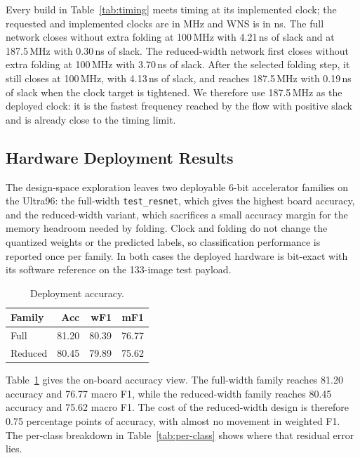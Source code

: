 Every build in Table~\ref{tab:timing} meets timing at its implemented clock; the
requested and implemented clocks are in MHz and WNS is in ns. The full network
closes without extra folding at 100\,MHz with 4.21\,ns of slack and at
187.5\,MHz with 0.30\,ns of slack. The reduced-width network first closes without
extra folding at 100\,MHz with 3.70\,ns of slack. After the selected folding step,
it still closes at 100\,MHz, with 4.13\,ns of slack, and reaches 187.5\,MHz with
0.19\,ns of slack when the clock target is tightened. We therefore use
187.5\,MHz as the deployed clock: it is the fastest frequency reached by the flow
with positive slack and is already close to the timing limit.

\subsection{Hardware Deployment Results}
\label{sec:res-hw}

The design-space exploration leaves two deployable 6-bit accelerator families on
the Ultra96: the full-width \texttt{test\_resnet}, which gives the highest board
accuracy, and the reduced-width variant, which sacrifices a small accuracy margin
for the memory headroom needed by folding. Clock and folding do not change the
quantized weights or the predicted labels, so classification performance is
reported once per family. In both cases the deployed hardware is bit-exact with
its software reference on the 133-image test payload.

\begin{table}[H]
\centering
\caption{Deployment accuracy.}
\label{tab:deployment}
\begin{tabular}{lrrr}
\toprule
Family & Acc & wF1 & mF1 \\
\midrule
Full    & 81.20 & 80.39 & 76.77 \\
Reduced & 80.45 & 79.89 & 75.62 \\
\bottomrule
\end{tabular}
\end{table}

Table~\ref{tab:deployment} gives the on-board accuracy view. The full-width
family reaches 81.20 accuracy and 76.77 macro F1, while the reduced-width family
reaches 80.45 accuracy and 75.62 macro F1. The cost of the reduced-width design
is therefore 0.75 percentage points of accuracy, with almost no movement in
weighted F1. The per-class breakdown in Table~\ref{tab:per-class} shows where
that residual error lies.

